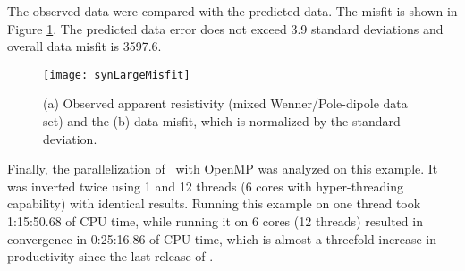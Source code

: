 The observed data were compared with the predicted data. The misfit is shown in Figure \ref{fig:synLargeMisfit}. The predicted data error does not exceed 3.9 standard deviations and overall data misfit is 3597.6.
%
\begin{figure}
\centering
\texttt{[image: synLargeMisfit]}
\caption{(a) Observed apparent resistivity (mixed Wenner/Pole-dipole data set) and the (b) data misfit, which is normalized by the standard deviation.}
\label{fig:synLargeMisfit}
\end{figure}

Finally, the parallelization of \prog~with OpenMP was analyzed on this example. It was inverted twice using 1 and 12 threads (6 cores with hyper-threading capability) with identical results. Running this example on one thread took 1:15:50.68 of CPU time, while running it on 6 cores (12 threads) resulted in convergence in 0:25:16.86 of CPU time, which is almost a threefold increase in productivity since the last release of .




